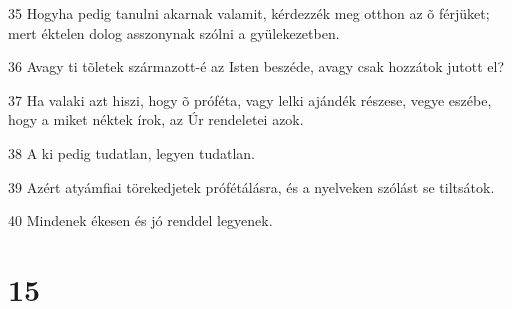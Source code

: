 \par 35 Hogyha pedig tanulni akarnak valamit, kérdezzék meg otthon az õ férjüket; mert éktelen dolog asszonynak szólni a gyülekezetben.
\par 36 Avagy ti tõletek származott-é az Isten beszéde, avagy csak hozzátok jutott el?
\par 37 Ha valaki azt hiszi, hogy õ próféta, vagy lelki ajándék részese, vegye eszébe, hogy a miket néktek írok, az Úr rendeletei azok.
\par 38 A ki pedig tudatlan, legyen tudatlan.
\par 39 Azért atyámfiai törekedjetek prófétálásra, és a nyelveken szólást se tiltsátok.
\par 40 Mindenek ékesen és jó renddel legyenek.

\chapter{15}

